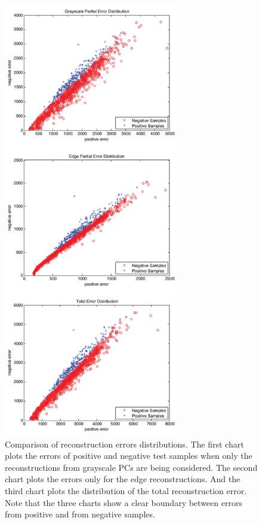 \documentclass[10pt, conference, compsocconf]{IEEEtran}
\begin{document}
\begin{figure}[tl!]
\centering
\includegraphics[width=3in]{dist_gray_vs_edge}
\caption{Comparison of reconstruction errors distributions. The first chart plots the errors of positive and negative test samples when only the reconstructions from grayscale PCs are being considered. The second chart plots the errors only for the edge reconstructions. And the third chart plots the distribution of the total reconstruction error. Note that the three charts show a clear boundary between errors from positive and from negative samples.}
\label{dist_gray_vs_edge}
\end{figure}
\end{document}
